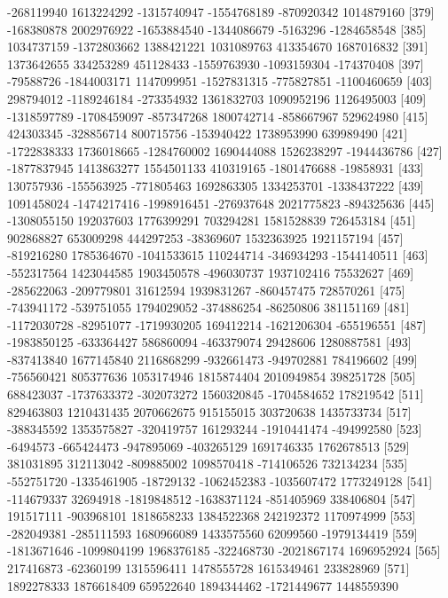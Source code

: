 \documentclass[11pt]{article}
\begin{document}
{\begin{Schunk}
\begin{Soutput}
[373]  -268119940  1613224292 -1315740947 -1554768189  -870920342  1014879160
[379]  -168380878  2002976922 -1653884540 -1344086679    -5163296 -1284658548
[385]  1034737159 -1372803662  1388421221  1031089763   413354670  1687016832
[391]  1373642655   334253289   451128433 -1559763930 -1093159304  -174370408
[397]   -79588726 -1844003171  1147099951 -1527831315  -775827851 -1100460659
[403]   298794012 -1189246184  -273354932  1361832703  1090952196  1126495003
[409] -1318597789 -1708459097  -857347268  1800742714  -858667967   529624980
[415]   424303345  -328856714   800715756  -153940422  1738953990   639989490
[421] -1722838333  1736018665 -1284760002  1690444088  1526238297 -1944436786
[427] -1877837945  1413863277  1554501133   410319165 -1801476688   -19858931
[433]   130757936  -155563925  -771805463  1692863305  1334253701 -1338437222
[439]  1091458024 -1474217416 -1998916451  -276937648  2021775823  -894325636
[445] -1308055150   192037603  1776399291   703294281  1581528839   726453184
[451]   902868827   653009298   444297253   -38369607  1532363925  1921157194
[457]  -819216280  1785364670 -1041533615   110244714  -346934293 -1544140511
[463]  -552317564  1423044585  1903450578  -496030737  1937102416    75532627
[469]  -285622063  -209779801    31612594  1939831267  -860457475   728570261
[475]  -743941172  -539751055  1794029052  -374886254   -86250806   381151169
[481] -1172030728   -82951077 -1719930205   169412214 -1621206304  -655196551
[487] -1983850125  -633364427   586860094  -463379074    29428606  1280887581
[493]  -837413840  1677145840  2116868299  -932661473  -949702881   784196602
[499]  -756560421   805377636  1053174946  1815874404  2010949854   398251728
[505]   688423037 -1737633372  -302073272  1560320845 -1704584652   178219542
[511]   829463803  1210431435  2070662675   915155015   303720638  1435733734
[517]  -388345592  1353575827  -320419757   161293244 -1910441474  -494992580
[523]    -6494573  -665424473  -947895069  -403265129  1691746335  1762678513
[529]   381031895   312113042  -809885002  1098570418  -714106526   732134234
[535]  -552751720 -1335461905   -18729132 -1062452383 -1035607472  1773249128
[541]  -114679337    32694918 -1819848512 -1638371124  -851405969   338406804
[547]   191517111  -903968101  1818658233  1384522368   242192372  1170974999
[553]  -282049381  -285111593  1680966089  1433575560    62099560 -1979134419
[559] -1813671646 -1099804199  1968376185  -322468730 -2021867174  1696952924
[565]   217416873   -62360199  1315596411  1478555728  1615349461   233828969
[571]  1892278333  1876618409   659522640  1894344462 -1721449677  1448559390

\end{Soutput}
\end{Schunk}}
\end{document}
